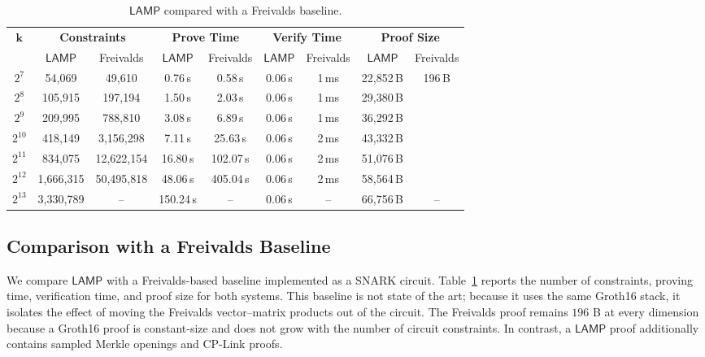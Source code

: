 \documentclass[conference,compsoc]{IEEEtran}
\newcommand{\protocol}{\textsf{LAMP}}   %
\theoremstyle{plain}
\theoremstyle{definition}
\theoremstyle{remark}
\providecommand{\DIFaddtex}[1]{{\protect\color{DIFADD} \sf #1}} %
\providecommand{\DIFaddbegin}{} %
\providecommand{\DIFaddend}{} %
\providecommand{\DIFadd}[1]{\texorpdfstring{\DIFaddtex{#1}}{#1}} %
\providecommand{\DIFaddincludegraphics}[2][]{{\color{blue}\fbox{\DIFOincludegraphics[#1]{#2}}}} %
\DeclareRobustCommand{\DIFaddbegin}{\DIFOaddbegin \let\includegraphics\DIFaddincludegraphics} %
\DeclareRobustCommand{\DIFaddend}{\DIFOaddend \let\includegraphics\DIFOincludegraphics} %
\begin{document}
\DIFaddend \begin{table}[!t]
\centering
\setlength{\tabcolsep}{3.5pt}
\begin{adjustbox}{max width=\textwidth}
\begin{tabular}{c cc cc cc cc}
\toprule
\multirow{2}{*}{\(\boldsymbol{k}\)}
& \multicolumn{2}{c}{\textbf{Constraints}}
& \multicolumn{2}{c}{\textbf{Prove Time}}
& \multicolumn{2}{c}{\textbf{Verify Time}}
& \multicolumn{2}{c}{\textbf{Proof Size}} \\
\cmidrule(lr){2-3}\cmidrule(lr){4-5}\cmidrule(lr){6-7}\cmidrule(lr){8-9}
& \(\protocol\) & Freivalds
& \(\protocol\) & Freivalds
& \(\protocol\) & Freivalds
& \(\protocol\) & Freivalds \\
\midrule
$2^7$    & 54{,}069      & 49{,}610       & 0.76\,s   & 0.58\,s   & 0.06\,s & 1\,ms & 22{,}852\,B & \multirow{6}{*}{196\,B} \\
$2^8$    & 105{,}915     & 197{,}194      & 1.50\,s   & 2.03\,s   & 0.06\,s & 1\,ms & 29{,}380\,B & \\
$2^9$    & 209{,}995     & 788{,}810      & 3.08\,s   & 6.89\,s   & 0.06\,s & 1\,ms & 36{,}292\,B & \\
$2^{10}$ & 418{,}149     & 3{,}156{,}298  & 7.11\,s   & 25.63\,s  & 0.06\,s & 2\,ms & 43{,}332\,B & \\
$2^{11}$ & 834{,}075     & 12{,}622{,}154 & 16.80\,s  & 102.07\,s & 0.06\,s & 2\,ms & 51{,}076\,B & \\
$2^{12}$ & 1{,}666{,}315 & 50{,}495{,}818 & 48.06\,s  & 405.04\,s & 0.06\,s & 2\,ms & 58{,}564\,B & \\
$2^{13}$ & 3{,}330{,}789 & --             & 150.24\,s & --        & 0.06\,s & --    & 66{,}756\,B & -- \\
\bottomrule
\end{tabular}
\end{adjustbox}
\vspace{6pt}
\caption{\(\protocol\) compared with a Freivalds baseline.}
\label{tab:lamp-vs-freivalds}
\end{table}


\subsection{Comparison with a Freivalds Baseline}
\label{sec:eval-freivalds}
We compare \(\protocol\) with a Freivalds-based baseline implemented as a
SNARK circuit. Table~\ref{tab:lamp-vs-freivalds} reports the number of
constraints, proving time, verification time, and proof size for both systems.
\DIFaddbegin \DIFadd{This baseline is not state of the art; because it uses the same Groth16 stack,
it isolates the effect of moving the Freivalds vector--matrix products out of
the circuit. The Freivalds proof remains \(196\) B at every dimension because a
Groth16 proof is constant-size and does not grow with the number of circuit
constraints. In contrast, a \(\protocol\) proof additionally contains sampled
Merkle openings and CP-Link proofs.
}\DIFaddend 
\end{document}

